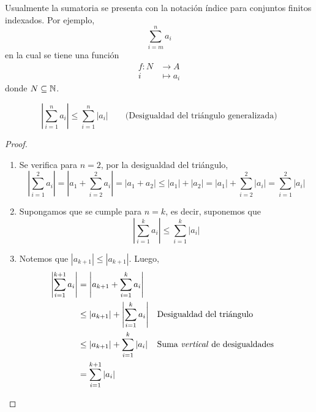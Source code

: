 
Usualmente la sumatoria se presenta con la notación índice para conjuntos finitos indexados. Por ejemplo, \[\sum_{i=m}^{n} a_i\]
en la cual se tiene una función%
\begin{align*}
f : N &\to A\\
i &\mapsto a_i
\end{align*}
donde $N\subseteq \mathbb{N}$.

\[\left| \sum_{i=1}^{n} a_i \right| \leq \sum_{i=1}^{n} |a_i| \qquad \text{(Desigualdad del triángulo generalizada)}\]

\begin{proof}\leavevmode
  \begin{enumerate}[label=\roman*)]
    \item Se verifica para $n=2$, por la desigualdad del triángulo,
    \[\left| \sum_{i=1}^{2} a_i \right| = \left|a_1 + \sum_{i=2}^{2} a_i \right| = |a_1 + a_2| \leq |a_1|+|a_2| = |a_1| + \sum_{i=2}^{2} |a_i| = \sum_{i=1}^{2} |a_i|\]
    \item Supongamos que se cumple para $n=k$, es decir, suponemos que
    \[\left| \sum_{i=1}^{k} a_i \right| \leq \sum_{i=1}^{k} |a_i|\]
    \item Notemos que $|a_{k+1}| \leq |a_{k+1}|$. Luego, 
    \begin{align*}
      \left| \sum_{i=1}^{k+1} a_i \right| &= \left|a_{k+1}+ \sum_{i=1}^{k} a_i \right|\\
      &\leq |a_{k+1}| + \left|\sum_{i=1}^{k} a_i \right| && \text{Desigualdad del triángulo}\\
      &\leq |a_{k+1}| + \sum_{i=1}^{k} |a_i| && \text{Suma \textit{vertical} de desigualdades}\\
      &= \sum_{i=1}^{k+1} |a_i|
    \end{align*}
  \end{enumerate}
\end{proof}

